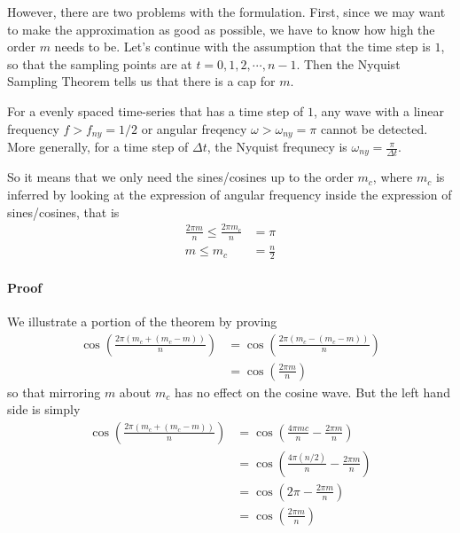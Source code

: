 However, there are two problems with the formulation. First, since we may want to make the approximation as good as possible, we have to know how high the order $m$ needs to be. Let's continue with the assumption that the time step is $1$, so that the sampling points are at $t = 0, 1, 2, \cdots, n-1$. Then the Nyquist Sampling Theorem tells us that there is a cap for $m$.
\begin{thm}
For a evenly spaced time-series that has a time step of $1$, any wave with a linear frequency $f > f_{ny} = 1/2$ or angular freqency $\omega > \omega_{ny} = \pi$ cannot be detected. More generally, for a time step of $\Delta t$, the Nyquist frequnecy is $\omega_{ny} = \frac{\pi}{\Delta t}$.
\end{thm}
So it means that we only need the sines/cosines up to the order $m_c$, where $m_c$ is inferred by looking at the expression of angular frequency inside the expression of sines/cosines, that is
\begin{align*}
\frac{2\pi m}{n} \leq \frac{2\pi m_c}{n} &= \pi \\
m \leq m_c &= \frac{n}{2}
\end{align*}
\paragraph{Proof} We illustrate a portion of the theorem by proving
\begin{align*}
\cos(\frac{2\pi (m_c + (m_c - m))}{n}) &= \cos(\frac{2\pi (m_c - (m_c - m))}{n}) \\
&= \cos(\frac{2\pi m}{n})
\end{align*}
so that mirroring $m$ about $m_c$ has no effect on the cosine wave. But the left hand side is simply
\begin{align*}
\cos(\frac{2\pi (m_c + (m_c - m))}{n}) &= \cos(\frac{4\pi mc}{n} - \frac{2\pi m}{n}) \\
&= \cos(\frac{4\pi (n/2)}{n} - \frac{2\pi m}{n}) \\
&= \cos(2\pi - \frac{2\pi m}{n}) \\
&= \cos(\frac{2\pi m}{n})
\end{align*}

